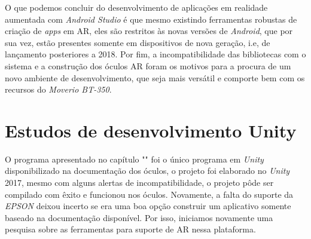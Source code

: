 
O que podemos concluir do desenvolvimento de aplicações em realidade aumentada com \textit{Android Studio} é que mesmo existindo ferramentas robustas de criação de \textit{apps} em AR, eles são restritos às novas versões de \textit{Android}, que por sua vez, estão presentes somente em dispositivos de nova geração, i.e, de lançamento posteriores a 2018. Por fim, a incompatibilidade das bibliotecas com o sistema e a construção dos óculos AR foram os motivos para a procura de um novo ambiente de desenvolvimento, que seja mais versátil e comporte bem com os recursos do \textit{Moverio BT-350}.

\section{Estudos de desenvolvimento Unity}

O programa apresentado no capítulo "" foi o único programa em \textit{Unity} disponibilizado na documentação dos óculos, o projeto foi elaborado no \textit{Unity} 2017, mesmo com alguns alertas de incompatibilidade, o projeto pôde ser compilado com êxito e funcionou nos óculos. Novamente, a falta do suporte da \textit{EPSON} deixou incerto se era uma boa opção construir um aplicativo somente baseado na documentação disponível. Por isso, iniciamos novamente uma pesquisa sobre as ferramentas para suporte de AR nessa plataforma.

